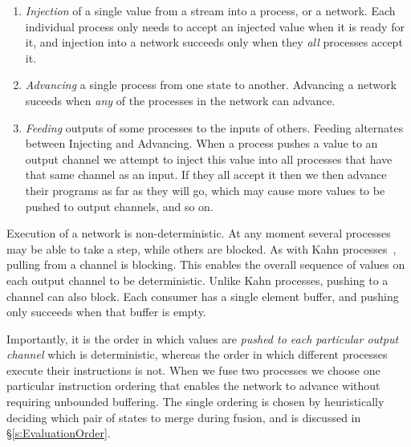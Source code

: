 \begin{enumerate}
\item \emph{Injection} of a single value from a stream into a process, or a network. Each individual process only needs to accept an injected  value when it is ready for it, and injection into a network succeeds only when they \emph{all} processes accept it.

\item \emph{Advancing} a single process from one state to another. Advancing a network suceeds when \emph{any} of the processes in the network can advance.

\item \emph{Feeding} outputs of some processes to the inputs of others. Feeding alternates between Injecting and Advancing. When a process pushes a value to an output channel we attempt to inject this value into all processes that have that same channel as an input. If they all accept it then we then advance their programs as far as they will go, which may cause more values to be pushed to output channels, and so on.
\end{enumerate}

Execution of a network is non-deterministic. At any moment several processes may be able to take a step, while others are blocked. As with Kahn processes~\cite{kahn1976coroutines}, pulling from a channel is blocking. This enables the overall sequence of values on each output channel to be deterministic. Unlike Kahn processes, pushing to a channel can also block. Each consumer has a single element buffer, and pushing only succeeds when that buffer is empty.


Importantly, it is the order in which values are \emph{pushed to each particular output channel} which is deterministic, whereas the order in which different processes execute their instructions is not. When we fuse two processes we choose one particular instruction ordering that enables the network to advance without requiring unbounded buffering. The single ordering is chosen by heuristically deciding which pair of states to merge during fusion, and is discussed in \S\ref{s:EvaluationOrder}.

